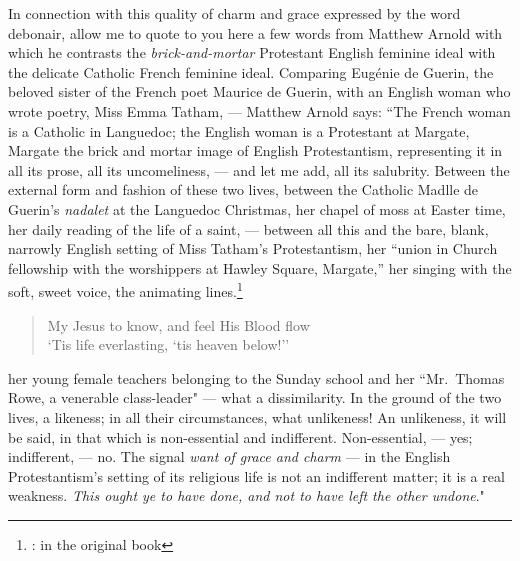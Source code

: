 In connection with this quality of charm and grace expressed by the word debonair, allow me to quote to you here a few words from Matthew Arnold with which he contrasts the \emph{brick-and-mortar}  Protestant English feminine ideal with the delicate Catholic French feminine ideal.
Comparing Eug\'enie de Guerin,  the beloved sister of the French poet Maurice de Guerin, with an English woman who wrote poetry, Miss Emma Tatham,  --- Matthew Arnold says: ``The French woman is a Catholic in Languedoc; the English woman is a Protestant at Margate, Margate the brick and mortar image of English Protestantism, representing it in all its prose, all its uncomeliness, --- and let me add, all its salubrity.
Between the external form and fashion of these two lives, between the Catholic Madlle de Guerin's \emph{nadalet} at the Languedoc Christmas, her chapel of moss at Easter time, her daily reading of the life of a saint, --- between all this and the bare, blank, narrowly English setting of Miss Tatham's Protestantism, her ``union in Church fellowship with the worshippers at Hawley Square, Margate,'' her singing with the soft, sweet voice, the animating lines.\footnote{: in the original book}
\begin{quote}\footnotesize
   My Jesus to know, and feel His Blood flow\\
   `Tis life everlasting, `tis heaven below!''\\
\end{quote}
her young female teachers belonging to the Sunday school and her ``Mr.~Thomas Rowe, a venerable class-leader" --- what a dissimilarity.
In the ground of the two lives, a likeness; in all their circumstances, what unlikeness!
An unlikeness, it will be said, in that which is non-essential and indifferent.
Non-essential, --- yes; indifferent, --- no.
The signal \emph{want of grace and charm} --- in the English Protestantism's setting of its religious life is not an indifferent matter; it is a real weakness.
\emph{This ought ye to have done, and not to have left the other undone}."

